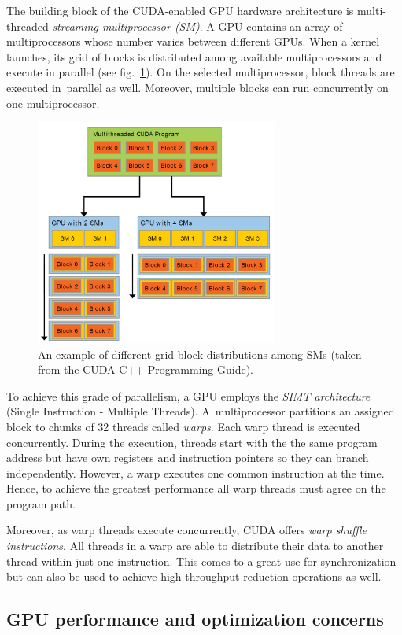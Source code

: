 The building block of the CUDA-enabled GPU hardware architecture is multi-threaded \emph{streaming multiprocessor (SM)}. A GPU contains an array of multiprocessors whose number varies between different GPUs. When a kernel launches, its grid of blocks is distributed among available multiprocessors and execute in parallel (see fig.~\ref{fig02:SM}). On the selected multiprocessor, block threads are executed in~parallel as well. Moreover, multiple blocks can run concurrently on one multiprocessor.

\begin{figure}\centering
	\includegraphics[width=8cm]{img/SM}
	\caption{An example of different grid block distributions among SMs (taken from the CUDA C++ Programming Guide).}
	\label{fig02:SM}
\end{figure}

To achieve this grade of parallelism, a GPU employs the \emph{SIMT architecture} (Single Instruction - Multiple Threads). A~multiprocessor partitions an assigned block to chunks of 32 threads called \emph{warps}. Each warp thread is executed concurrently. During the execution, threads start with the the same program address but have own registers and instruction pointers so they can branch independently. However, a warp executes one common instruction at the time. Hence, to achieve the greatest performance all warp threads must agree on the program path.

Moreover, as warp threads execute concurrently, CUDA offers \emph{warp shuffle instructions}. All threads in a warp are able to distribute their data to another thread within just one instruction. This comes to a great use for synchronization but can also be used to achieve high throughput reduction operations as well.

\subsection{GPU performance and optimization concerns}

